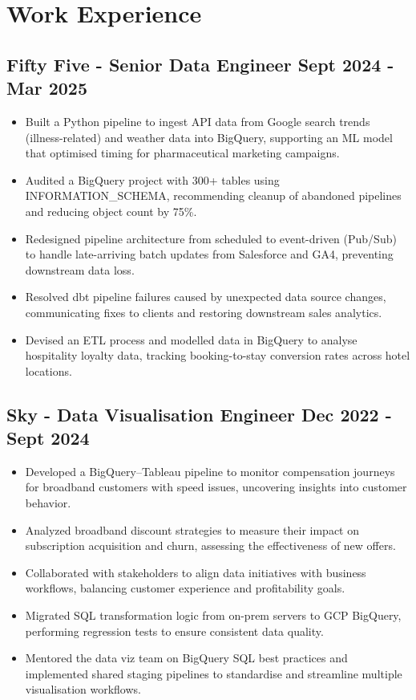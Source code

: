 \documentclass[a4paper, 10pt]{article}
\begin{document}
\vspace{-6.5mm}

\section*{Work Experience}

\subsection*{\textbf{Fifty Five - Senior Data Engineer} \hfill  Sept 2024 - Mar 2025}
\begin{itemize}[noitemsep]
    \item Built a Python pipeline to ingest API data from Google search trends (illness-related) and weather data into BigQuery, supporting an ML model that optimised timing for pharmaceutical marketing campaigns.
    \item Audited a BigQuery project with 300+ tables using INFORMATION\_SCHEMA, recommending cleanup of abandoned pipelines and reducing object count by 75\%.
    \item Redesigned pipeline architecture from scheduled to event-driven (Pub/Sub) to handle late-arriving batch updates from Salesforce and GA4, preventing downstream data loss.
    \item Resolved dbt pipeline failures caused by unexpected data source changes, communicating fixes to clients and restoring downstream sales analytics.
    \item Devised an ETL process and modelled data in BigQuery to analyse hospitality loyalty data, tracking booking-to-stay conversion rates across hotel locations.
\end{itemize}

\subsection*{\textbf{Sky - Data Visualisation Engineer} \hfill  Dec 2022 - Sept 2024}
\begin{itemize}[noitemsep]
    \item Developed a BigQuery–Tableau pipeline to monitor compensation journeys for broadband customers with speed issues, uncovering insights into customer behavior.
    \item Analyzed broadband discount strategies to measure their impact on subscription acquisition and churn, assessing the effectiveness of new offers.
    \item Collaborated with stakeholders to align data initiatives with business workflows, balancing customer experience and profitability goals.
    \item Migrated SQL transformation logic from on-prem servers to GCP BigQuery, performing regression tests to ensure consistent data quality.
    \item Mentored the data viz team on BigQuery SQL best practices and implemented shared staging pipelines to standardise and streamline multiple visualisation workflows.
\end{itemize}
\end{document}
